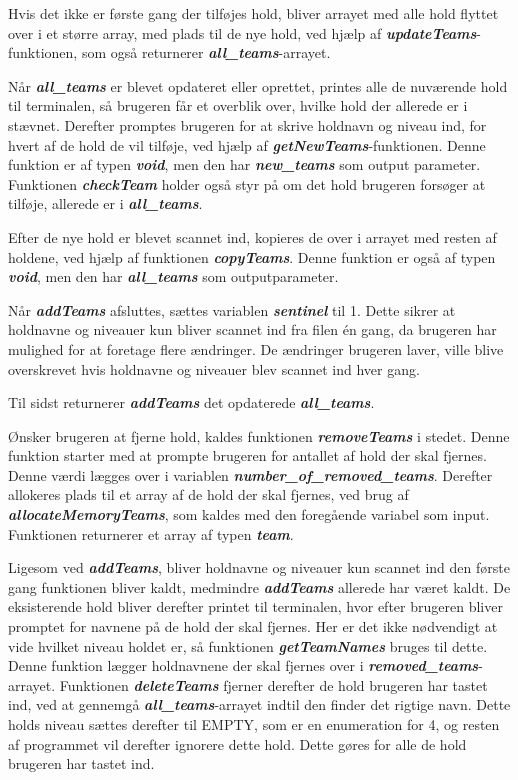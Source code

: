 \par
Hvis det ikke er første gang der tilføjes hold, bliver arrayet med alle hold flyttet over i et større array, med plads til de nye hold, ved hjælp af \textbf{\textit{updateTeams}}-funktionen, som også returnerer \textbf{\textit{all\_teams}}-arrayet. 
\par
Når \textbf{\textit{all\_teams}} er blevet opdateret eller oprettet, printes alle de nuværende hold til terminalen, så brugeren får et overblik over, hvilke hold der allerede er i stævnet. Derefter promptes brugeren for at skrive holdnavn og niveau ind, for hvert af de hold de vil tilføje, ved hjælp af \textbf{\textit{getNewTeams}}-funktionen. Denne funktion er af typen \textbf{\textit{void}}, men den har \textbf{\textit{new\_teams}} som output parameter. Funktionen \textbf{\textit{checkTeam}} holder også styr på om det hold brugeren forsøger at tilføje, allerede er i \textbf{\textit{all\_teams}}. 
\par
Efter de nye hold er blevet scannet ind, kopieres de over i arrayet med resten af holdene, ved hjælp af funktionen \textbf{\textit{copyTeams}}. Denne funktion er også af typen \textbf{\textit{void}}, men den har \textbf{\textit{all\_teams}} som outputparameter.
\par
Når \textbf{\textit{addTeams}} afsluttes, sættes variablen \textbf{\textit{sentinel}} til 1. Dette sikrer at holdnavne og niveauer kun bliver scannet ind fra filen én gang, da brugeren har mulighed for at foretage flere ændringer. De ændringer brugeren laver, ville blive overskrevet hvis holdnavne og niveauer blev scannet ind hver gang.
\par
Til sidst returnerer \textbf{\textit{addTeams}} det opdaterede \textbf{\textit{all\_teams}}.
\par
Ønsker brugeren at fjerne hold, kaldes funktionen \textbf{\textit{removeTeams}} i stedet. Denne funktion starter med at prompte brugeren for antallet af hold der skal fjernes. Denne værdi lægges over i variablen \textbf{\textit{number\_of\_removed\_teams}}. Derefter allokeres plads til et array af de hold der skal fjernes, ved brug af \textbf{\textit{allocateMemoryTeams}}, som kaldes med den foregående variabel som input. Funktionen returnerer et array af typen \textbf{\textit{team}}. 
\par
Ligesom ved \textbf{\textit{addTeams}}, bliver holdnavne og niveauer kun scannet ind den første gang funktionen bliver kaldt, medmindre \textbf{\textit{addTeams}} allerede har været kaldt. De eksisterende hold bliver derefter printet til terminalen, hvor efter brugeren bliver promptet for navnene på de hold der skal fjernes. Her er det ikke nødvendigt at vide hvilket niveau holdet er, så funktionen \textbf{\textit{getTeamNames}} bruges til dette. Denne funktion lægger holdnavnene der skal fjernes over i \textbf{\textit{removed\_teams}}-arrayet. Funktionen \textbf{\textit{deleteTeams}} fjerner derefter de hold brugeren har tastet ind, ved at gennemgå \textbf{\textit{all\_teams}}-arrayet indtil den finder det rigtige navn. Dette holds niveau sættes derefter til EMPTY, som er en enumeration for 4, og resten af programmet vil derefter ignorere dette hold. Dette gøres for alle de hold brugeren har tastet ind.
